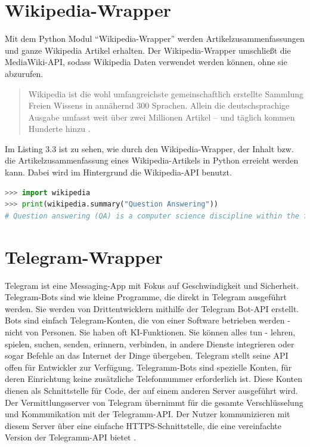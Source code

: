 \documentclass[
        ngerman,
        paper=a4,
        numbers=noendperiod,
]{scrreprt}
\begin{document}
\section{Wikipedia-Wrapper}
Mit dem Python Modul \enquote{Wikipedia-Wrapper} \citep{Goldsmith/Wikipedia:API} werden  Artikelzusammenfassungen und ganze Wikipedia Artikel erhalten. Der Wikipedia-Wrapper umschließt die MediaWiki-API, sodass Wikipedia Daten verwendet werden können, ohne sie abzurufen.

\begin{quote}
Wikipedia ist die wohl umfangreichste gemeinschaftlich erstellte
Sammlung Freien Wissens in annähernd 300 Sprachen. Allein die
deutschsprachige Ausgabe umfasst weit über zwei Millionen Artikel
– und täglich kommen Hunderte hinzu \citep{WIKIPEDIAWelt}.
\end{quote}

Im Listing 3.3 ist zu sehen, wie durch den Wikipedia-Wrapper, der Inhalt bzw. die Artikelzusammenfassung eines Wikipedia-Artikels in Python erreicht werden kann. Dabei wird im Hintergrund die Wikipedia-API \citep{API:HauptseiteMediaWiki} benutzt.


\begin{lstlisting}[language=Python, caption=Wikipedia Artikelzusammenfassungen]
>>> import wikipedia
>>> print(wikipedia.summary("Question Answering"))
# Question answering (QA) is a computer science discipline within the fields of information retrieval and natural language processing (NLP), which is concerned with building systems that automatically answer questions posed by humans in a natural language.
\end{lstlisting}


\section{Telegram-Wrapper}
Telegram ist eine Messaging-App mit Fokus auf Geschwindigkeit und Sicherheit. Telegram-Bots sind wie kleine Programme, die direkt in Telegram ausgeführt werden. Sie werden von Drittentwicklern mithilfe der Telegram Bot-API erstellt.
Bots sind einfach Telegram-Konten, die von einer Software betrieben werden - nicht von Personen. Sie haben oft KI-Funktionen. Sie können alles tun - lehren, spielen, suchen, senden, erinnern, verbinden, in andere Dienste integrieren oder sogar Befehle an das Internet der Dinge übergeben. Telegram stellt seine API offen für Entwickler zur Verfügung. Telegramm-Bots sind spezielle Konten, für deren Einrichtung keine zusätzliche Telefonnummer erforderlich ist. Diese Konten dienen als Schnittstelle für Code, der auf einem anderen Server ausgeführt wird. Der Vermittlungsserver von Telegram übernimmt für  die gesamte Verschlüsselung und Kommunikation mit der Telegramm-API. Der Nutzer  kommunizieren mit diesem Server über eine einfache HTTPS-Schnittstelle, die eine vereinfachte Version der Telegramm-API bietet \citep{TelegramFAQ}\citep{TelegramAPIs}.
\end{document}
